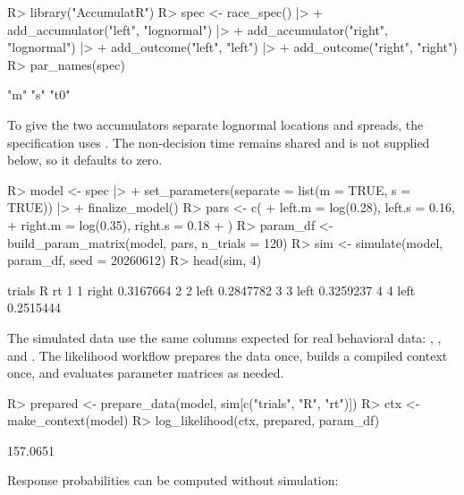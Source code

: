 \documentclass[article]{jss}
\newcommand{\fct}[1]{\code{#1()}}
\begin{document}
\begin{CodeChunk}
\begin{CodeInput}
R> library("AccumulatR")
R> spec <- race_spec() |>
+   add_accumulator("left", "lognormal") |>
+   add_accumulator("right", "lognormal") |>
+   add_outcome("left", "left") |>
+   add_outcome("right", "right")
R> par_names(spec)
\end{CodeInput}
\begin{CodeOutput}
[1] "m"  "s"  "t0"
\end{CodeOutput}
\end{CodeChunk}

To give the two accumulators separate lognormal locations and spreads, the
specification uses \fct{set\_parameters}. The non-decision time 
remains shared and is not supplied below, so it defaults to zero.

\begin{CodeChunk}
\begin{CodeInput}
R> model <- spec |>
+   set_parameters(separate = list(m = TRUE, s = TRUE)) |>
+   finalize_model()
R> pars <- c(
+   left.m = log(0.28), left.s = 0.16,
+   right.m = log(0.35), right.s = 0.18
+ )
R> param_df <- build_param_matrix(model, pars, n_trials = 120)
R> sim <- simulate(model, param_df, seed = 20260612)
R> head(sim, 4)
\end{CodeInput}
\begin{CodeOutput}
  trials     R        rt
1      1 right 0.3167664
2      2  left 0.2847782
3      3  left 0.3259237
4      4  left 0.2515444
\end{CodeOutput}
\end{CodeChunk}

The simulated data use the same columns expected for real behavioral data:
, , and . The likelihood workflow prepares the
data once, builds a compiled context once, and evaluates parameter matrices as
needed.

\begin{CodeChunk}
\begin{CodeInput}
R> prepared <- prepare_data(model, sim[c("trials", "R", "rt")])
R> ctx <- make_context(model)
R> log_likelihood(ctx, prepared, param_df)
\end{CodeInput}
\begin{CodeOutput}
[1] 157.0651
\end{CodeOutput}
\end{CodeChunk}

Response probabilities can be computed without simulation:
\end{document}
